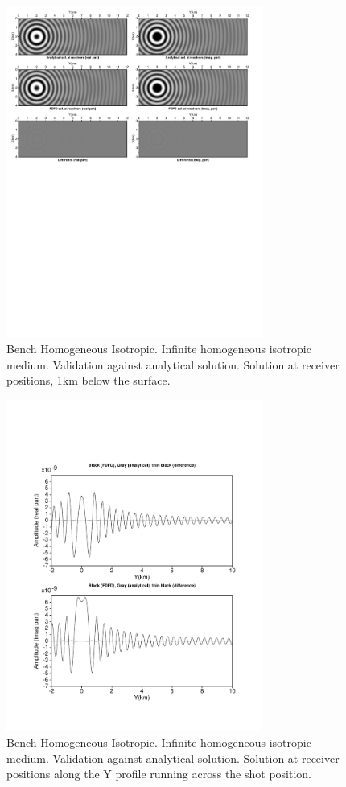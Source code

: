 \begin{figure}[!h]
\centering 
\includegraphics[width=0.75\textwidth]{images/dsfdm/fig_rec_snap_homogeneous_isotropic.pdf}
\caption{Bench Homogeneous Isotropic. Infinite homogeneous isotropic medium. Validation against analytical
solution. Solution at receiver positions, 1km below the surface.}
\label{rec_snap_homogeneous_isotropic} 
\end{figure}
\begin{figure}[!h]
\centering 
\includegraphics[width=0.75\textwidth]{images/dsfdm/fig_rec_log_homogeneous_isotropic.pdf}
\caption{Bench Homogeneous Isotropic. Infinite homogeneous isotropic medium. Validation against analytical
solution. Solution at receiver positions along the Y profile running across the shot position.}
\label{rec_log_homogeneous_isotropic} 
\end{figure}


